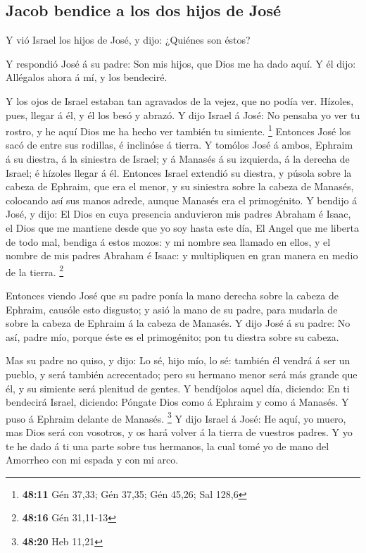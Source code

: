 \hypertarget{jacob-bendice-a-los-dos-hijos-de-josuxe9}{%
\subsection{Jacob bendice a los dos hijos de
José}\label{jacob-bendice-a-los-dos-hijos-de-josuxe9}}

 Y vió Israel los hijos de José, y dijo: ¿Quiénes son
éstos?

 Y respondió José á su padre: Son mis hijos, que Dios me
ha dado aquí. Y él dijo: Allégalos ahora á mí, y los bendeciré.

 Y los ojos de Israel estaban tan agravados de la vejez,
que no podía ver. Hízoles, pues, llegar á él, y él los besó y abrazó.
 Y dijo Israel á José: No pensaba yo ver tu rostro, y he
aquí Dios me ha hecho ver también tu simiente. \footnote{\textbf{48:11}
  Gén 37,33; Gén 37,35; Gén 45,26; Sal 128,6}  Entonces
José los sacó de entre sus rodillas, é inclinóse á tierra.
 Y tomólos José á ambos, Ephraim á su diestra, á la
siniestra de Israel; y á Manasés á su izquierda, á la derecha de Israel;
é hízoles llegar á él.  Entonces Israel extendió su
diestra, y púsola sobre la cabeza de Ephraim, que era el menor, y su
siniestra sobre la cabeza de Manasés, colocando así sus manos adrede,
aunque Manasés era el primogénito.  Y bendijo á José, y
dijo: El Dios en cuya presencia anduvieron mis padres Abraham é Isaac,
el Dios que me mantiene desde que yo soy hasta este día, 
El Angel que me liberta de todo mal, bendiga á estos mozos: y mi nombre
sea llamado en ellos, y el nombre de mis padres Abraham é Isaac: y
multipliquen en gran manera en medio de la tierra. \footnote{\textbf{48:16}
  Gén 31,11-13}

 Entonces viendo José que su padre ponía la mano derecha
sobre la cabeza de Ephraim, causóle esto disgusto; y asió la mano de su
padre, para mudarla de sobre la cabeza de Ephraim á la cabeza de
Manasés.  Y dijo José á su padre: No así, padre mío,
porque éste es el primogénito; pon tu diestra sobre su cabeza.

 Mas su padre no quiso, y dijo: Lo sé, hijo mío, lo sé:
también él vendrá á ser un pueblo, y será también acrecentado; pero su
hermano menor será más grande que él, y su simiente será plenitud de
gentes.  Y bendíjolos aquel día, diciendo: En ti
bendecirá Israel, diciendo: Póngate Dios como á Ephraim y como á
Manasés. Y puso á Ephraim delante de Manasés. \footnote{\textbf{48:20}
  Heb 11,21}  Y dijo Israel á José: He aquí, yo muero,
mas Dios será con vosotros, y os hará volver á la tierra de vuestros
padres.  Y yo te he dado á ti una parte sobre tus
hermanos, la cual tomé yo de mano del Amorrheo con mi espada y con mi
arco.

